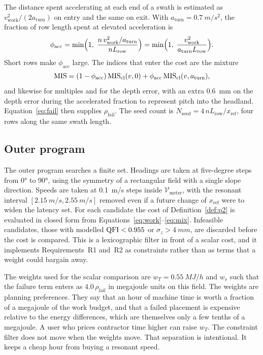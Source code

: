 The distance spent accelerating at each end of a swath is estimated as \(v_{\mathrm{work}}^2/(2a_{\mathrm{turn}})\) on entry and the same on exit. With \(a_{\mathrm{turn}}=\SI{0.7}{m/s^2}\), the fraction of row length spent at elevated acceleration is
\begin{equation}
\label{eq:frac}
\phi_{\mathrm{acc}} = \min\Bigl(1,\; \frac{n\, v_{\mathrm{work}}^2 / a_{\mathrm{turn}}}{n L_{\mathrm{row}}}\Bigr)
= \min\Bigl(1,\; \frac{v_{\mathrm{work}}^2}{a_{\mathrm{turn}} L_{\mathrm{row}}}\Bigr).
\end{equation}
Short rows make \(\phi_{\mathrm{acc}}\) large. The indices that enter the cost are the mixture
\begin{equation}
\label{eq:mix}
\mathrm{MIS} = (1-\phi_{\mathrm{acc}})\,\mathrm{MIS}_{\mathrm{cl}}(v,0) + \phi_{\mathrm{acc}}\,\mathrm{MIS}_{\mathrm{cl}}(v,a_{\mathrm{turn}}),
\end{equation}
and likewise for multiples and for the depth error, with an extra \SI{0.6}{mm} on the depth error during the accelerated fraction to represent pitch into the headland. Equation~\eqref{eq:fail} then supplies \(\rho_{\mathrm{fail}}\). The seed count is \(N_{\mathrm{seed}} = 4\, n L_{\mathrm{row}} / x_{\mathrm{ref}}\), four rows along the same swath length.

\subsection{Outer program}

The outer program searches a finite set. Headings are taken at five-degree steps from \ang{0} to \ang{90}, using the symmetry of a rectangular field with a single slope direction. Speeds are taken at \SI{0.1}{m/s} steps inside \(\mathcal{V}_{\mathrm{meter}}\), with the resonant interval \([\SI{2.15}{m/s},\SI{2.55}{m/s}]\) removed even if a future change of \(x_{\mathrm{ref}}\) were to widen the latency set. For each candidate the cost of Definition~\ref{def:p2} is evaluated in closed form from Equations~\eqref{eq:work}--\eqref{eq:mix}. Infeasible candidates, those with modelled \(\mathrm{QFI}<0.955\) or \(\sigma_z>\SI{4}{mm}\), are discarded before the cost is compared. This is a lexicographic filter in front of a scalar cost, and it implements Requirements~R1 and~R2 as constraints rather than as terms that a weight could bargain away.

The weights used for the scalar comparison are \(w_T=\SI{0.55}{MJ/h}\) and \(w_s\) such that the failure term enters as \(4.0\,\rho_{\mathrm{fail}}\) in megajoule units on this field. The weights are planning preferences. They say that an hour of machine time is worth a fraction of a megajoule of the work budget, and that a failed placement is expensive relative to the energy differences, which are themselves only a few tenths of a megajoule. A user who prices contractor time higher can raise \(w_T\). The constraint filter does not move when the weights move. That separation is intentional. It keeps a cheap hour from buying a resonant speed.

